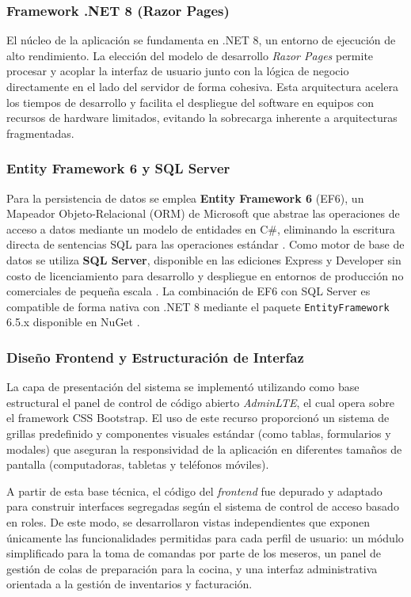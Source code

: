 \subsubsection{Framework .NET 8 (Razor Pages)}
El núcleo de la aplicación se fundamenta en .NET 8, un entorno de ejecución de alto rendimiento. La elección del modelo de desarrollo \textit{Razor Pages} permite procesar y acoplar la interfaz de usuario junto con la lógica de negocio directamente en el lado del servidor de forma cohesiva. Esta arquitectura acelera los tiempos de desarrollo y facilita el despliegue del software en equipos con recursos de hardware limitados, evitando la sobrecarga inherente a arquitecturas fragmentadas.

\subsubsection{Entity Framework 6 y SQL Server}
Para la persistencia de datos se emplea \textbf{Entity Framework 6} (EF6),
un Mapeador Objeto-Relacional (ORM) de Microsoft que abstrae las operaciones
de acceso a datos mediante un modelo de entidades en C\#, eliminando la
escritura directa de sentencias SQL para las operaciones estándar
\cite{ef6_docs}. Como motor de base de datos se utiliza \textbf{SQL Server},
disponible en las ediciones Express y Developer sin costo de licenciamiento
para desarrollo y despliegue en entornos de producción no comerciales de
pequeña escala \cite{sqlserver_editions}. La combinación de EF6 con SQL
Server es compatible de forma nativa con .NET 8 mediante el paquete
\texttt{EntityFramework} 6.5.x disponible en NuGet \cite{ef6_nuget}.

\subsubsection{Diseño Frontend y Estructuración de Interfaz}
La capa de presentación del sistema se implementó utilizando como base estructural el panel de control de código abierto \textit{AdminLTE}, el cual opera sobre el framework CSS Bootstrap. El uso de este recurso proporcionó un sistema de grillas predefinido y componentes visuales estándar (como tablas, formularios y modales) que aseguran la responsividad de la aplicación en diferentes tamaños de pantalla (computadoras, tabletas y teléfonos móviles). 

A partir de esta base técnica, el código del \textit{frontend} fue depurado y adaptado para construir interfaces segregadas según el sistema de control de acceso basado en roles. De este modo, se desarrollaron vistas independientes que exponen únicamente las funcionalidades permitidas para cada perfil de usuario: un módulo simplificado para la toma de comandas por parte de los meseros, un panel de gestión de colas de preparación para la cocina, y una interfaz administrativa orientada a la gestión de inventarios y facturación.

